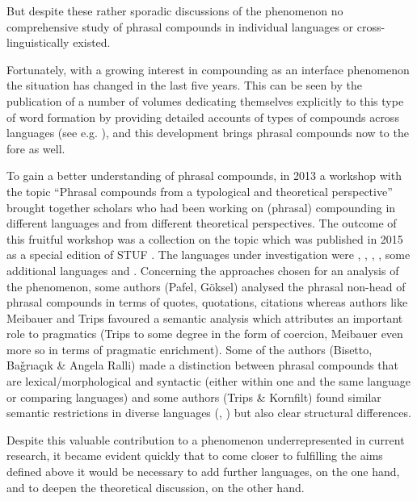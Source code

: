 \documentclass[output=paper]{LSP/langsci}
\begin{document}
But despite these rather sporadic discussions of the phenomenon no comprehensive study of phrasal compounds in individual languages or cross-linguisti\-cally
existed. 

Fortunately, with a growing interest in compounding as an interface
pheno\-me\-non the situation has changed in the last five years. This can
be seen by the publication of a number of volumes dedicating
themselves explicitly to this type of word formation by providing
detailed accounts of types of compounds across languages (see e.g. \citealp{ScaliseVogelEd2010,LieberStekauer2009}), and
this development brings phrasal compounds now to the fore as well.


To gain a better understanding of phrasal compounds, in 2013 a
workshop with the topic ``Phrasal compounds from a typological and
theoretical perspective'' brought together scholars who had been
working on (phrasal) compounding in different languages and from
different theoretical perspectives. The outcome of this fruitful
workshop was a collection on the topic which was published in 2015 as a
special edition of STUF \citep{TripsKornfilt2015volume}. The languages
under investigation were , , , , some additional
 languages and . Concerning the approaches chosen for an
analysis of the phenomenon, some authors (Pafel, Göksel)
analysed the phrasal non-head of phrasal compounds in terms of quotes,
quotations, citations whereas authors like Meibauer and Trips favoured
a semantic analysis which attributes an important role to pragmatics
(Trips to some degree in the form of coercion, Meibauer even more so
in terms of pragmatic enrichment). Some of the authors (Bisetto,
Ba\v{g}r{\i}a\c{c}{\i}k \& Angela Ralli) made a distinction between
phrasal compounds that are lexical/morphological and syntactic (either
within one and the same language or comparing languages) and some authors
(Trips \& Kornfilt) found similar semantic restrictions in diverse
languages (, ) but also clear structural differences.

Despite this valuable contribution to a phenomenon underrepresented in
current research, it became evident quickly that to come closer to
fulfilling the aims defined above it would be necessary to add further
languages, on the one hand, and to deepen the theoretical discussion,
on the other hand. 
\end{document}
